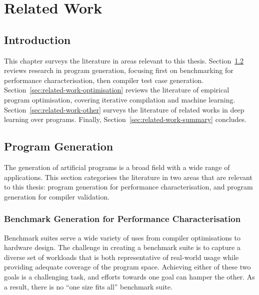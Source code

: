 \chapter{Related Work}
\label{chap:related-work}

\section{Introduction}

This chapter surveys the literature in areas relevant to this thesis. Section~\ref{sec:related-work-generation} reviews research in program generation, focusing first on benchmarking for performance characterisation, then compiler test case generation. Section~\ref{sec:related-work-optimisation} reviews the literature of empirical program optimisation, covering iterative compilation and machine learning. Section~\ref{sec:related-work-other} surveys the literature of related works in deep learning over programs. Finally, Section~\ref{sec:related-work-summary} concludes.


\section{Program Generation}
\label{sec:related-work-generation}

The generation of artificial programs is a broad field with a wide range of applications. This section categorises the literature in two areas that are relevant to this thesis: program generation for performance characterisation, and program generation for compiler validation.

\subsection{Benchmark Generation for Performance Characterisation}

Benchmark suites serve a wide variety of uses from compiler optimisations to hardware design. The challenge in creating a benchmark suite is to capture a diverse set of workloads that is both representative of real-world usage while providing adequate coverage of the program space. Achieving either of these two goals is a challenging task, and efforts towards one goal can hamper the other. As a result, there is no ``one size fits all'' benchmark suite.

